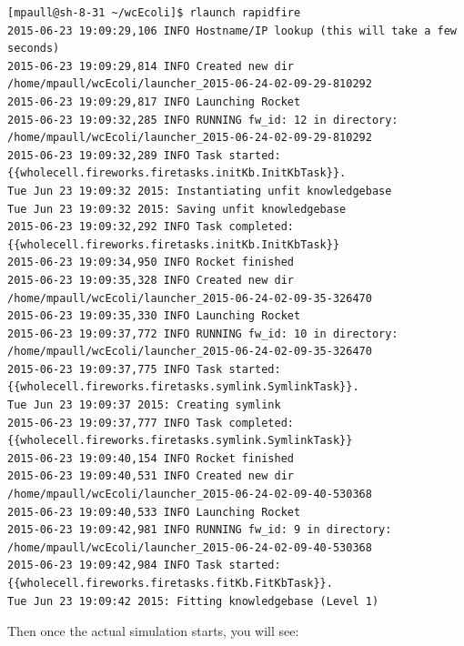 \documentclass[12pt]{article}
\begin{document}
\begin{lstlisting}
[mpaull@sh-8-31 ~/wcEcoli]$ rlaunch rapidfire
2015-06-23 19:09:29,106 INFO Hostname/IP lookup (this will take a few seconds)
2015-06-23 19:09:29,814 INFO Created new dir /home/mpaull/wcEcoli/launcher_2015-06-24-02-09-29-810292
2015-06-23 19:09:29,817 INFO Launching Rocket
2015-06-23 19:09:32,285 INFO RUNNING fw_id: 12 in directory: /home/mpaull/wcEcoli/launcher_2015-06-24-02-09-29-810292
2015-06-23 19:09:32,289 INFO Task started: {{wholecell.fireworks.firetasks.initKb.InitKbTask}}.
Tue Jun 23 19:09:32 2015: Instantiating unfit knowledgebase
Tue Jun 23 19:09:32 2015: Saving unfit knowledgebase
2015-06-23 19:09:32,292 INFO Task completed: {{wholecell.fireworks.firetasks.initKb.InitKbTask}} 
2015-06-23 19:09:34,950 INFO Rocket finished
2015-06-23 19:09:35,328 INFO Created new dir /home/mpaull/wcEcoli/launcher_2015-06-24-02-09-35-326470
2015-06-23 19:09:35,330 INFO Launching Rocket
2015-06-23 19:09:37,772 INFO RUNNING fw_id: 10 in directory: /home/mpaull/wcEcoli/launcher_2015-06-24-02-09-35-326470
2015-06-23 19:09:37,775 INFO Task started: {{wholecell.fireworks.firetasks.symlink.SymlinkTask}}.
Tue Jun 23 19:09:37 2015: Creating symlink
2015-06-23 19:09:37,777 INFO Task completed: {{wholecell.fireworks.firetasks.symlink.SymlinkTask}} 
2015-06-23 19:09:40,154 INFO Rocket finished
2015-06-23 19:09:40,531 INFO Created new dir /home/mpaull/wcEcoli/launcher_2015-06-24-02-09-40-530368
2015-06-23 19:09:40,533 INFO Launching Rocket
2015-06-23 19:09:42,981 INFO RUNNING fw_id: 9 in directory: /home/mpaull/wcEcoli/launcher_2015-06-24-02-09-40-530368
2015-06-23 19:09:42,984 INFO Task started: {{wholecell.fireworks.firetasks.fitKb.FitKbTask}}.
Tue Jun 23 19:09:42 2015: Fitting knowledgebase (Level 1)
 \end{lstlisting}



\hfill \break
\hfill \break



Then once the actual simulation starts, you will see:

\hfill \break
\hfill \break
\end{document}
